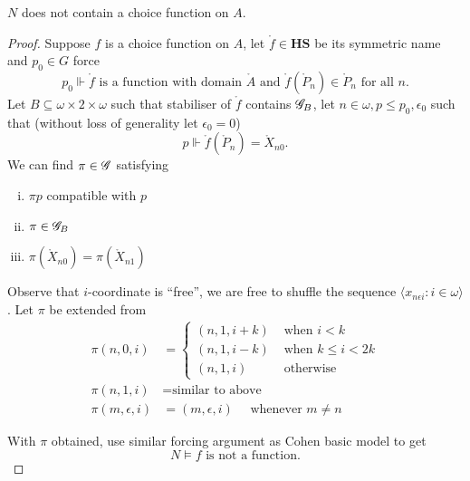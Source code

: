 \begin{theorem}
    \(N\) does not contain a choice function on \(A\).
\end{theorem}
\begin{proof}
Suppose \(f\) is a choice function on \(A\), let \(\mathring{f}\in\mathbf{HS}\) be its symmetric name and \(p_0\in G\) force
\[p_0\Vdash \mathring{f}\text{ is a function with domain } \mathring{A} \text{ and } \mathring{f}(\mathring{P}_n) \in \mathring{P}_n\text{ for all }n .\]
Let \(B\subseteq \omega\times2\times\omega\) such that stabiliser of \(\mathring{f}\) contains \(\mathscr{G}_B\),
let \(n\in\omega, p\leq p_0, \epsilon_0\) such that (without loss of generality let \(\epsilon_0 = 0\))
\[ p\Vdash \mathring{f}(\mathring{P}_n) = \mathring{X}_{n0}. \]
We can find \(\pi\in\mathscr{G}\) satisfying
\begin{enumerate}[i.]
    \item \(\pi p\) compatible with \(p\)
    \item \(\pi \in \mathscr{G}_B\)
    \item \(\pi(\mathring{X}_{n0}) = \pi(\mathring{X}_{n1})\)
\end{enumerate}
Observe that \(i\)-coordinate is ``free'',
we are free to shuffle the sequence \(\langle x_{n\epsilon i}:i\in\omega\rangle\).
Let \(\pi\) be extended from
\begin{align*}
    \pi(n,0,i) &=
    \begin{cases}
        (n,1,i+k) &\text{ when } i < k \\
        (n,1,i-k) &\text{ when } k \leq i < 2k \\
        (n,1,i) &\text{ otherwise}
    \end{cases} \\
    \pi(n,1,i) &= \text{similar to above} \\
    \pi(m,\epsilon,i) &= (m,\epsilon,i) \quad\text{ whenever }m \ne n
\end{align*}

With \(\pi\) obtained, use similar forcing argument as Cohen basic model to get
\[ N\models f\text{ is not a function}. \tag*{\qedhere} \]
\end{proof}
